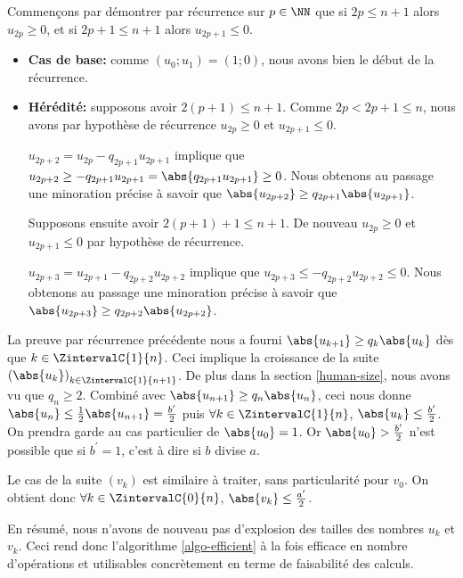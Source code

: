 \medskip


Commençons par démontrer par récurrence sur $p \in \NN$ que si $2p \leq n+1$ alors $u_{2p} \geq 0$, et si $2p + 1 \leq n+1$ alors $u_{2p+1} \leq 0$.

\begin{itemize}[label = \small\textbullet]
	\item \textbf{Cas de base:} comme $(u_0 ; u_1) = (1 ; 0)$, nous avons bien le début de la récurrence.


	\item  \textbf{Hérédité:} supposons avoir $2(p+1) \leq n+1$. Comme $2p < 2p + 1 \leq n$, nous avons par hypothèse de récurrence $u_{2p} \geq 0$ et $u_{2p+1} \leq 0$.
	
	\noindent
	$u_{2p+2} = u_{2p} - q_{2p+1} u_{2p+1}$ implique que 
	$u_{2p+2} \geq - q_{2p+1} u_{2p+1} = \abs{q_{2p+1} u_{2p+1}} \geq 0$.
	Nous obtenons au passage une minoration précise à savoir que $\abs{u_{2p+2}} \geq q_{2p+1} \abs{u_{2p+1}}$.
	
	
	\medskip
	\noindent
	Supposons ensuite avoir $2(p+1) + 1 \leq n+1$. De nouveau $u_{2p} \geq 0$ et $u_{2p+1} \leq 0$ par hypothèse de récurrence.
	
	\noindent
	$u_{2p+3} = u_{2p+1} - q_{2p+2} u_{2p+2}$ implique que
	$u_{2p+3} \leq - q_{2p+2} u_{2p+2} \leq 0$.
	Nous obtenons au passage une minoration précise à savoir que $\abs{u_{2p+3}} \geq q_{2p+2} \abs{u_{2p+2}}$.
\end{itemize}


La preuve par récurrence précédente nous a fourni $\abs{u_{k+1}} \geq q_k \abs{u_k}$ dès que $k \in \ZintervalC{1}{n}$. Ceci implique la croissance de la suite $\left( \abs{u_k} \right)_{k \in \ZintervalC{1}{n+1}}$.
De plus dans la section \ref{human-size}, nous avons vu que $q_n \geq 2$. Combiné avec $\abs{u_{n+1}} \geq q_n \abs{u_n}$, ceci nous donne $\abs{u_n} \leq \frac{1}{2} \abs{u_{n+1}} = \frac{b^\prime}{2}$ puis $\forall k \in \ZintervalC{1}{n}$, $\abs{u_k} \leq \frac{b^\prime}{2}$. On prendra garde au cas particulier de $\abs{u_0} = 1$. Or $\abs{u_0} > \frac{b^\prime}{2}$ n'est possible que si $b^\prime = 1$, c'est à dire si $b$ divise $a$.


\medskip


Le cas de la suite $(v_k)$ est similaire à traiter, sans particularité pour $v_0$. On obtient donc $\forall k \in \ZintervalC{0}{n}$, $\abs{v_k} \leq \frac{a^\prime}{2}$.


\medskip


En résumé, nous n'avons de nouveau pas d'explosion des tailles des nombres $u_k$ et $v_k$. Ceci rend donc l'algorithme \ref{algo-efficient} à la fois efficace en nombre d'opérations et utilisables concrètement en terme de faisabilité des calculs.